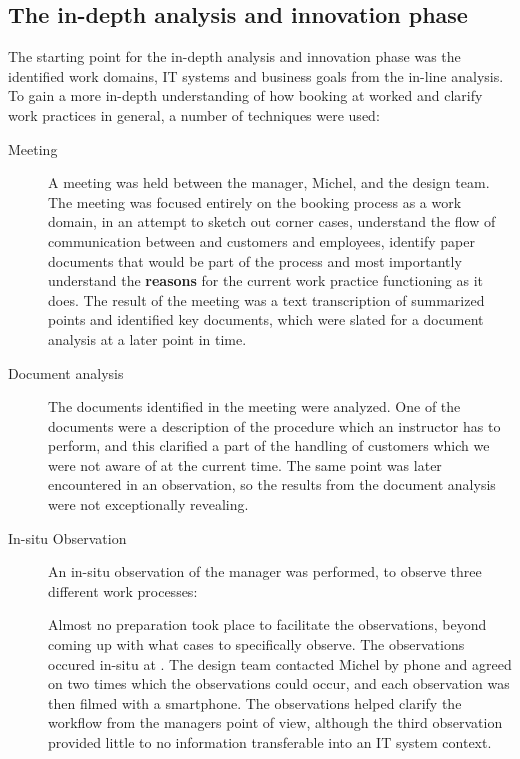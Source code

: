 \subsection{The in-depth analysis and innovation phase}
The starting point for the in-depth analysis and innovation phase was the
identified work domains, IT systems and business goals from the in-line
analysis.  To gain a more in-depth understanding of how booking at \gomonkey{}
worked and clarify work practices in general, a number of techniques were used:

\begin{description}
    \item [Meeting] A meeting was held
        between the manager, Michel, and the design team. The meeting was
        focused entirely on the booking process as a work domain, in an attempt
        to sketch out corner cases, understand the flow of communication between
        \gomonkey{} and customers and employees, identify paper documents that
        would be part of the process and most importantly understand the
        \textbf{reasons} for the current work practice functioning as it does.
        The result of the meeting was a text transcription of summarized points
        and identified key documents, which were slated for a document analysis
        at a later point in time. 

    \item [Document analysis] The documents identified in the meeting were
        analyzed. One of the documents were a description of the procedure
	which an instructor has to perform, and this clarified a part of the
	handling of customers which we were not aware of at the current time. 
	The same point was later encountered in an observation, so the results 
	from the document analysis were not exceptionally revealing.

    \item [In-situ Observation] An in-situ observation of the manager was performed,
        to observe three different work processes: 
        Almost no preparation took place to facilitate the observations, beyond
        coming up with what cases to specifically observe. The observations
        occured in-situ at \gomonkey{}. The design team contacted Michel by
        phone and agreed on two times which the observations could occur, and
        each observation was then filmed with a smartphone. The observations
        helped clarify the workflow from the managers point of view, although
        the third observation provided little to no information transferable
        into an IT system context.


\end{description}
